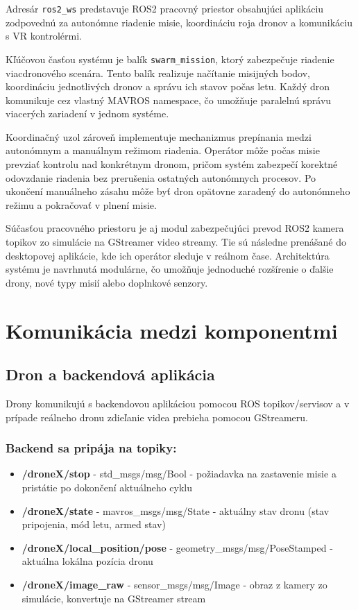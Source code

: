 \documentclass[a4paper,12pt]{article}
\begin{document}
Adresár \texttt{ros2\_ws} predstavuje ROS2 pracovný priestor obsahujúci aplikáciu zodpovednú za autonómne riadenie misie, koordináciu roja dronov a komunikáciu s VR kontrolérmi.

Kľúčovou časťou systému je balík \texttt{swarm\_mission}, ktorý zabezpečuje riadenie viacdronového scenára. 
Tento balík realizuje načítanie misijných bodov, koordináciu jednotlivých dronov a správu ich stavov počas letu. 
Každý dron komunikuje cez vlastný MAVROS namespace, čo umožňuje paralelnú správu viacerých zariadení v jednom systéme.

Koordinačný uzol zároveň implementuje mechanizmus prepínania medzi autonómnym a manuálnym režimom riadenia. 
Operátor môže počas misie prevziať kontrolu nad konkrétnym dronom, pričom systém zabezpečí korektné odovzdanie riadenia bez prerušenia ostatných autonómnych procesov. 
Po ukončení manuálneho zásahu môže byť dron opätovne zaradený do autonómneho režimu a pokračovať v plnení misie.

Súčasťou pracovného priestoru je aj modul zabezpečujúci prevod ROS2 kamera topikov zo simulácie na GStreamer video streamy. 
Tie sú následne prenášané do desktopovej aplikácie, kde ich operátor sleduje v reálnom čase. 
Architektúra systému je navrhnutá modulárne, čo umožňuje jednoduché rozšírenie o ďalšie drony, nové typy misií alebo doplnkové senzory.


\newpage
\section{Komunikácia medzi komponentmi}

\subsection{Dron a backendová aplikácia}

Drony komunikujú s backendovou aplikáciou pomocou ROS topikov/servisov a v prípade reálneho dronu zdieľanie videa prebieha pomocou GStreameru.

\subsubsection*{Backend sa pripája na topiky:}

\begin{itemize}
    \item \textbf{/droneX/stop} - std\_msgs/msg/Bool - požiadavka na zastavenie misie a pristátie po dokončení aktuálneho cyklu
    \item \textbf{/droneX/state} - mavros\_msgs/msg/State - aktuálny stav dronu (stav pripojenia, mód letu, armed stav)
    \item \textbf{/droneX/local\_position/pose} - geometry\_msgs/msg/PoseStamped - aktuálna lokálna pozícia dronu
    \item \textbf{/droneX/image\_raw} - sensor\_msgs/msg/Image - obraz z kamery zo simulácie, konvertuje na GStreamer stream
\end{itemize}
\end{document}
